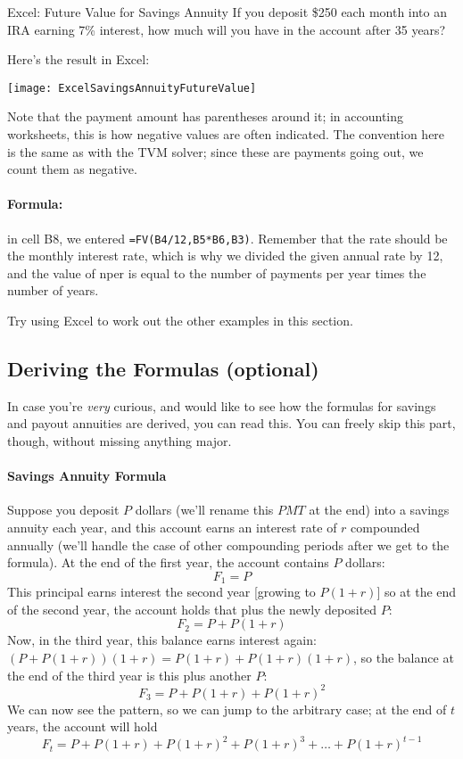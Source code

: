 \begin{example}{Excel: Future Value for Savings Annuity}
If you deposit \$250 each month into an IRA earning 7\% interest, how much will you have in the account after 35 years?

\sol
Here's the result in Excel:
\begin{center}
\texttt{[image: ExcelSavingsAnnuityFutureValue]}
\end{center}

Note that the payment amount has parentheses around it; in accounting worksheets, this is how negative values are often indicated.  The convention here is the same as with the TVM solver; since these are payments going out, we count them as negative.\\

\paragraph{Formula:} in cell B8, we entered \texttt{=FV(B4/12,B5*B6,B3)}.  Remember that the rate should be the monthly interest rate, which is why we divided the given annual rate by 12, and the value of nper is equal to the number of payments per year times the number of years.
\end{example}

\begin{try}
Try using Excel to work out the other examples in this section.
\end{try}
\vfill
\pagebreak

\subsection{Deriving the Formulas (optional)}
In case you're \emph{very} curious, and would like to see how the formulas for savings and payout annuities are derived, you can read this.  You can freely skip this part, though, without missing anything major.

\paragraph{Savings Annuity Formula}
Suppose you deposit $P$ dollars (we'll rename this $PMT$ at the end) into a savings annuity each year, and this account earns an interest rate of $r$ compounded annually (we'll handle the case of other compounding periods after we get to the formula).  At the end of the first year, the account contains $P$ dollars:
\[F_1 = P\]
This principal earns interest the second year [growing to $P(1+r)$] so at the end of the second year, the account holds that plus the newly deposited $P$:
\[F_2 = P+P(1+r)\]
Now, in the third year, this balance earns interest again: $(P+P(1+r))(1+r) = P(1+r) + P(1+r)(1+r)$, so the balance at the end of the third year is this plus another $P$:
\[F_3 = P + P(1+r) + P(1+r)^2\]
We can now see the pattern, so we can jump to the arbitrary case; at the end of $t$ years, the account will hold
\begin{equation}
F_t = P + P(1+r) + P(1+r)^2 + P(1+r)^3 + \ldots + P(1+r)^{t-1}
\end{equation}

